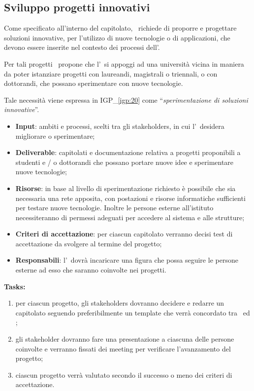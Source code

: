 	\subsection{Sviluppo progetti innovativi}
	
		Come specificato all'interno del capitolato, \istituto~richiede di proporre e progettare soluzioni innovative, per l’utilizzo di nuove tecnologie o di applicazioni, che devono essere inserite nel contesto dei processi dell'\istituto.
		
		Per tali progetti \azienda~propone che l'\istituto~si appoggi ad una università vicina in maniera da poter istanziare progetti con laureandi, magistrali o triennali, o con dottorandi, che possano sperimentare con nuove tecnologie.
		
		Tale necessità viene espressa in {\color{pantone}IGP\_\ref{igp:20}} come ``\textit{sperimentazione di soluzioni innovative}''.
	
		\begin{itemize}[noitemsep]
			\renewcommand\labelitemi{--}
			\item \textbf{Input}: ambiti e processi, scelti tra gli stakeholders, in cui l'\istituto~desidera migliorare o sperimentare;
			\item \textbf{Deliverable}: capitolati e documentazione relativa a progetti proponibili a studenti e / o dottorandi che possano portare nuove idee e sperimentare nuove tecnologie;
			\item \textbf{Risorse}: in base al livello di sperimentazione richiesto è possibile che sia necessaria una rete apposita, con postazioni e risorse informatiche sufficienti per testare nuove tecnologie.
			Inoltre le persone esterne all'istituto necessiteranno di permessi adeguati per accedere al sistema e alle strutture;
			\item \textbf{Criteri di accettazione}: per ciascun capitolato verranno decisi test di accettazione da svolgere al termine del progetto;
			\item \textbf{Responsabili}: l'\istituto~dovrà incaricare una figura che possa seguire le persone esterne ad esso che saranno coinvolte nei progetti.
		\end{itemize}
		
		\textbf{Tasks:}
		\begin{enumerate}[noitemsep]
			\item per ciascun progetto, gli stakeholders dovranno decidere e redarre un capitolato seguendo preferibilmente un template che verrà concordato tra \azienda~ed \istituto;
			\item gli stakeholder dovranno fare una presentazione a ciascuna delle persone coinvolte e verranno fissati dei meeting per verificare l'avanzamento del progetto;
			\item ciascun progetto verrà valutato secondo il successo o meno dei criteri di accettazione.
		\end{enumerate}
	
